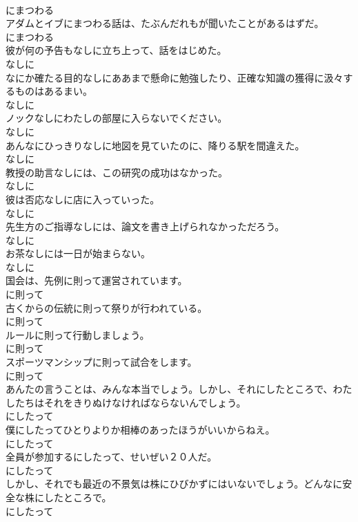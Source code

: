 \documentclass[8pt]{extreport}
\begin{document}
\begin{CJK}{UTF8}{min}
\\	にまつわる
\\	アダムとイブにまつわる話は、たぶんだれもが聞いたことがあるはずだ。	
\\	にまつわる
\\	彼が何の予告もなしに立ち上って、話をはじめた。	
\\	なしに
\\	なにか確たる目的なしにああまで懸命に勉強したり、正確な知識の獲得に汲々するものはあるまい。	
\\	なしに
\\	ノックなしにわたしの部屋に入らないでください。	
\\	なしに
\\	あんなにひっきりなしに地図を見ていたのに、降りる駅を間違えた。	
\\	なしに
\\	教授の助言なしには、この研究の成功はなかった。	
\\	なしに
\\	彼は否応なしに店に入っていった。	
\\	なしに
\\	先生方のご指導なしには、論文を書き上げられなかっただろう。	
\\	なしに
\\	お茶なしには一日が始まらない。	
\\	なしに
\\	国会は、先例に則って運営されています。	
\\	に則って
\\	古くからの伝統に則って祭りが行われている。	
\\	に則って
\\	ルールに則って行動しましょう。	
\\	に則って
\\	スポーツマンシップに則って試合をします。	
\\	に則って
\\	あんたの言うことは、みんな本当でしょう。しかし、それにしたところで、わたしたちはそれをきりぬけなければならないんでしょう。	
\\	にしたって
\\	僕にしたってひとりよりか相棒のあったほうがいいからねえ。	
\\	にしたって
\\	全員が参加するにしたって、せいぜい２０人だ。	
\\	にしたって
\\	しかし、それでも最近の不景気は株にひびかずにはいないでしょう。どんなに安全な株にしたところで。	
\\	にしたって

\end{CJK}
\end{document}
